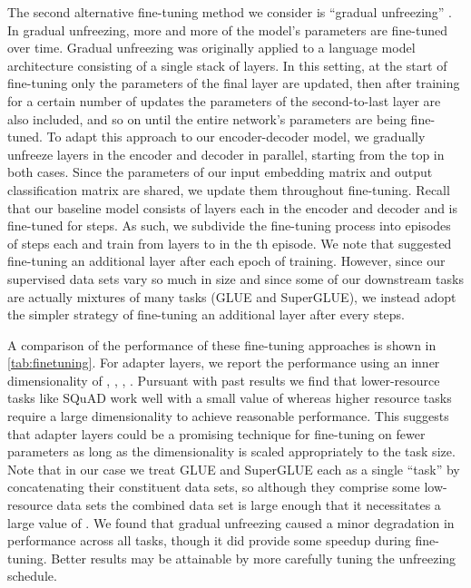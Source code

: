 \documentclass[twoside,11pt]{article}
\begin{document}
The second alternative fine-tuning method we consider is ``gradual unfreezing'' \citep{howard2018universal}.
In gradual unfreezing, more and more of the model's parameters are fine-tuned over time.
Gradual unfreezing was originally applied to a language model architecture consisting of a single stack of layers.
In this setting, at the start of fine-tuning only the parameters of the final layer are updated, then after training for a certain number of updates the parameters of the second-to-last layer are also included, and so on until the entire network's parameters are being fine-tuned.
To adapt this approach to our encoder-decoder model, we gradually unfreeze layers in the encoder and decoder in parallel, starting from the top in both cases.
Since the parameters of our input embedding matrix and output classification matrix are shared, we update them throughout fine-tuning.
Recall that our baseline model consists of  layers each in the encoder and decoder and is fine-tuned for  steps.
As such, we subdivide the fine-tuning process into  episodes of  steps each and train from layers  to  in the th episode.
We note that \cite{howard2018universal} suggested fine-tuning an additional layer after each epoch of training.
However, since our supervised data sets vary so much in size and since some of our downstream tasks are actually mixtures of many tasks (GLUE and SuperGLUE), we instead adopt the simpler strategy of fine-tuning an additional layer after every  steps.

A comparison of the performance of these fine-tuning approaches is shown in \cref{tab:finetuning}.
For adapter layers, we report the performance using an inner dimensionality  of , , , .
Pursuant with past results \citep{houlsby2019parameter,bapna2019simple} we find that lower-resource tasks like SQuAD work well with a small value of  whereas higher resource tasks require a large dimensionality to achieve reasonable performance.
This suggests that adapter layers could be a promising technique for fine-tuning on fewer parameters as long as the dimensionality is scaled appropriately to the task size.
Note that in our case we treat GLUE and SuperGLUE each as a single ``task'' by concatenating their constituent data sets, so although they comprise some low-resource data sets the combined data set is large enough that it necessitates a large value of .
We found that gradual unfreezing caused a minor degradation in performance across all tasks, though it did provide some speedup during fine-tuning.
Better results may be attainable by more carefully tuning the unfreezing schedule.
\end{document}
